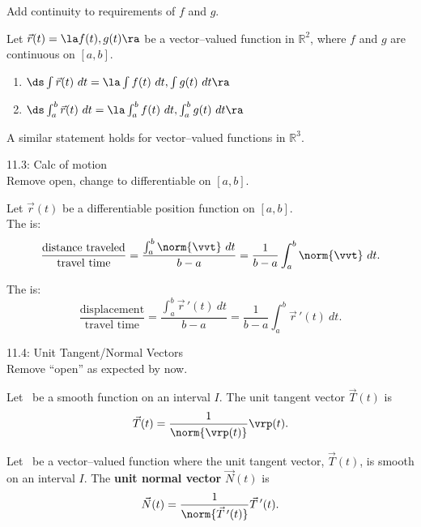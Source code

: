 \documentclass{article}
\begin{document}
Add continuity to requirements of $f$ and $g$.

{Let $\vec r(t) = \la f(t),g(t)\ra$ be a vector--valued function in $\mathbb{R}^2$, where $f$ and $g$ are continuous on $[a,b]$.
\begin{enumerate}
	\item $\ds \int \vec r(t)\ dt = \la \int f(t)\ dt, \int g(t)\ dt\ra$
	\item	$\ds \int_a^b \vec r(t)\ dt = \la \int_a^b f(t)\ dt, \int_a^b g(t)\ dt\ra$
\end{enumerate}
A similar statement holds for vector--valued functions in $\mathbb{R}^3$.
}

11.3: Calc of motion\\

Remove open, change to differentiable on $[a,b]$.

{Let $\vec r(t)$ be a differentiable position function on $[a,b]$. \\

The  is:
$$\frac{\text{distance traveled}}{\text{travel time}} = \frac{\int_a^b \norm{\vvt}\ dt}{b-a} = \frac1{b-a}\int_a^b\norm{\vvt}\ dt.$$

The  is:
$$\frac{\text{displacement}}{\text{travel time}} = \frac{\int_a^b \vec{r}\,'(t)\ dt}{b-a} = \frac1{b-a}\int_a^b\vec{r}\,'(t)\ dt.$$
}

11.4: Unit Tangent/Normal Vectors\\

Remove ``open'' as expected by now.

{Let \vrt\ be a smooth function on an interval $I$. The unit tangent vector $\vec T(t)$ is
 
$$\vec T(t) = \frac{1}{\rule{0pt}{9pt}\norm{\vrp(t)}}\vrp(t).$$
}

{Let \vrt\ be a vector--valued function where the unit tangent vector, $\vec T(t)$, is smooth on an  interval $I$. The \textbf{unit normal vector} $\vec N(t)$ is
$$\vec N(t) = \frac1{\norm{\vec T\,'(t)}}\vec T\,'(t).$$
}
\end{document}
